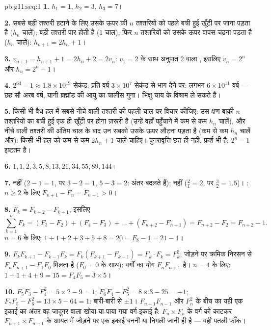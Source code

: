 \begin{solution}{pb:g11:seq:1}
\textbf{1.} $h_1 = 1$, $h_2 = 3$, $h_3 = 7$।

\textbf{2.} सबसे बड़ी तश्तरी हटाने के लिए उसके ऊपर की $n$ तश्तरियों को
पहले बची हुई खूँटी पर जाना पड़ता है ($h_n$ चालें); बड़ी तश्तरी पार होती है
($1$ चाल); फिर $n$ तश्तरियों को उसके ऊपर वापस चढ़ना पड़ता है ($h_n$
चालें): $h_{n+1} = 2h_n + 1$।

\textbf{3.} $v_{n+1} = h_{n+1} + 1 = 2h_n + 2 = 2v_n$: $v_1 = 2$ के साथ अनुपात $2$ वाला , इसलिए $v_n = 2^n$ और
$h_n = 2^n - 1$।

\textbf{4.} $2^{64} - 1 \approx 1.8 \times 10^{19}$ सेकंड; प्रति वर्ष $3 \times 10^7$ सेकंड से भाग देने पर: लगभग $6 \times 10^{11}$
वर्ष --- छह सौ अरब वर्ष, यानी ब्रह्मांड की आयु का चालीस गुना। भिक्षु चाय के
विश्राम ले सकते हैं।

\textbf{5.} किसी भी वैध हल में सबसे नीचे वाली तश्तरी की पहली चाल पर विचार
कीजिए: उस क्षण बाक़ी $n$ तश्तरियों का बची हुई एक ही खूँटी पर होना ज़रूरी है
(उन्हें वहाँ पहुँचाने में कम से कम $h_n$ चालें), और नीचे वाली तश्तरी की
अंतिम चाल के बाद उन सबको उसके ऊपर लौटना पड़ता है (कम से कम $h_n$ चालें और):
किसी भी हल को कम से कम $2h_n + 1$ चालें चाहिए। पुनरावृत्ति छत ही नहीं, फ़र्श भी
है: $2^n - 1$ इष्टतम है।

\textbf{6.} $1, 1, 2, 3, 5, 8, 13, 21, 34, 55, 89, 144$।

\textbf{7.}  नहीं ($2 - 1 = 1$, पर $3 - 2 = 1$, $5 - 3 = 2$: अंतर बदलते हैं); 
नहीं ($\frac21 = 2$, पर $\frac32 = 1.5$)। : $n \geq 2$ के लिए $F_{n+1} - F_n = F_{n-1} > 0$।

\textbf{8.} $F_k = F_{k+2} - F_{k+1}$, इसलिए
\[
\sum_{k=1}^{n} F_k = (F_3 - F_2) + (F_4 - F_3) + \dots +
(F_{n+2} - F_{n+1}) = F_{n+2} - F_2 = F_{n+2} - 1 .
\]
$n = 6$ के लिए: $1 + 1 + 2 + 3 + 5 + 8 = 20 = F_8 - 1 = 21 - 1$।

\textbf{9.} $F_k F_{k+1} - F_{k-1} F_k = F_k (F_{k+1} -
F_{k-1}) = F_k \cdot F_k = F_k^2$; जोड़ने पर क्रमिक निरसन से $F_n F_{n+1} - F_1 F_0$ मिलता है ($F_0 = 0$ के साथ):
वर्गों का योग $F_n F_{n+1}$ है। $n = 4$ के लिए: $1 + 1 + 4 + 9 = 15 = F_4 F_5 =
3 \times 5$।

\textbf{10.} $F_5 F_3 - F_4^2 = 5 \times 2 - 9 = 1$; $F_6 F_4 - F_5^2 = 8 \times 3 - 25 = -1$; $F_7 F_5 - F_6^2 = 13 \times 5 - 64 = 1$: बारी-बारी से $\pm 1$। $F_{n+1} F_{n-1}$ और $F_n^2$ के बीच
का यही एक इकाई का अंतर वह जादूगर वाला खोया-या-पाया गया वर्ग-इकाई है: $F_n \times F_n$
के वर्ग को काटकर $F_{n+1} \times F_{n-1}$ के आयत में जोड़ने पर एक इकाई बननी या निगली जानी ही
है --- वही पतली फाँक।


\end{solution}
